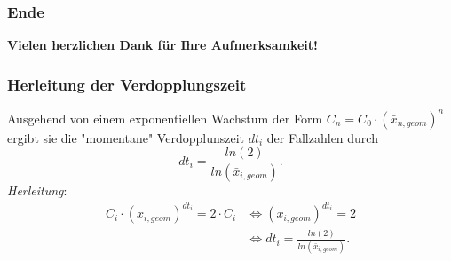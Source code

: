 \documentclass{beamer}
\begin{document}
\begin{frame}
	\frametitle{Ende}
		\centering
		\textbf{Vielen herzlichen Dank für Ihre Aufmerksamkeit!}
\end{frame}
 
\begin{frame}
	\frametitle{Herleitung der Verdopplungszeit}
	Ausgehend von einem exponentiellen Wachstum der Form $C_n = C_0 \cdot (\bar{x}_{n, geom})^{n}$ ergibt sie die "momentane" Verdopplunszeit $dt_i$ der Fallzahlen durch $$dt_i = \frac{ln(2)}{ln(\bar{x}_{i, geom})}.$$
	\emph{Herleitung}: 
	\begin{align*} C_i \cdot (\bar{x}_{i, geom})^{dt_i} = 2 \cdot C_i 
		 &\iff (\bar{x}_{i, geom})^{dt_i} = 2 \\
	 	&\iff dt_i = \frac{ln(2)}{ln(\bar{x}_{i, geom})}.
	\end{align*}
\end{frame}
\end{document}
